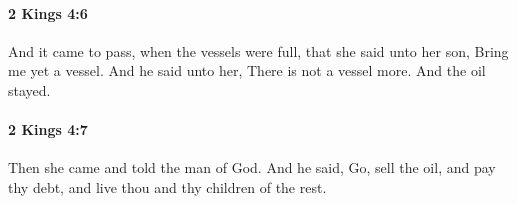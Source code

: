 		\paragraph{2 Kings 4:6} %
			\label{2KINGS-4-6}

			And it came to pass, when the vessels were full, that she said unto her son, Bring me yet a vessel. And he said unto her, There is not a vessel more. And the oil stayed.


		\paragraph{2 Kings 4:7} %
			\label{2KINGS-4-7}

			Then she came and told the man of God. And he said, Go, sell the oil, and pay thy debt, and live thou and thy children of the rest.


